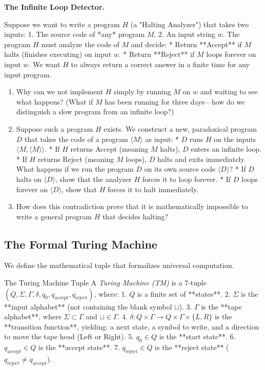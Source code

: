 \documentclass[12pt, a4paper]{book}
\newcommand{\newterm}[1]{\textit{\textcolor{DiscoveryColor}{#1}}}
\begin{document}
\begin{puzzlebox}
\textbf{The Infinite Loop Detector.}

Suppose we want to write a program $H$ (a "Halting Analyzer") that takes two inputs:
1. The source code of *any* program $M$.
2. An input string $w$.
The program $H$ must analyze the code of $M$ and decide:
* Return **Accept** if $M$ halts (finishes executing) on input $w$.
* Return **Reject** if $M$ loops forever on input $w$.
We want $H$ to always return a correct answer in a finite time for any input program.
\begin{enumerate}[label=(\alph*), leftmargin=*]
  \item Why can we not implement $H$ simply by running $M$ on $w$ and waiting to see what happens? (What if $M$ has been running for three days—how do we distinguish a slow program from an infinite loop?)
  \item Suppose such a program $H$ exists. We construct a new, paradoxical program $D$ that takes the code of a program $\langle M \rangle$ as input:
        * $D$ runs $H$ on the inputs $\langle M, \langle M \rangle \rangle$.
        * If $H$ returns Accept (meaning $M$ halts), $D$ enters an infinite loop.
        * If $H$ returns Reject (meaning $M$ loops), $D$ halts and exits immediately.
        What happens if we run the program $D$ on its own source code $\langle D \rangle$?
        * If $D$ halts on $\langle D \rangle$, show that the analyzer $H$ forces it to loop forever.
        * If $D$ loops forever on $\langle D \rangle$, show that $H$ forces it to halt immediately.
  \item How does this contradiction prove that it is mathematically impossible to write a general program $H$ that decides halting?
\end{enumerate}
\end{puzzlebox}

\subsection{The Formal Turing Machine}

We define the mathematical tuple that formalizes universal computation.

\begin{namedconcept}{The Turing Machine Tuple}
A \newterm{Turing Machine (TM)} is a 7-tuple $(Q, \Sigma, \Gamma, \delta, q_0, q_{\text{accept}}, q_{\text{reject}})$, where:
1. $Q$ is a finite set of **states**.
2. $\Sigma$ is the **input alphabet** (not containing the blank symbol $\sqcup$).
3. $\Gamma$ is the **tape alphabet**, where $\Sigma \subset \Gamma$ and $\sqcup \in \Gamma$.
4. $\delta: Q \times \Gamma \to Q \times \Gamma \times \{L, R\}$ is the **transition function**, yielding: a next state, a symbol to write, and a direction to move the tape head (Left or Right).
5. $q_0 \in Q$ is the **start state**.
6. $q_{\text{accept}} \in Q$ is the **accept state**.
7. $q_{\text{reject}} \in Q$ is the **reject state** ($q_{\text{reject}} \neq q_{\text{accept}}$).
\end{namedconcept}
\end{document}
